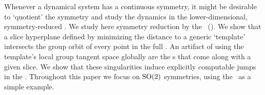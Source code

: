 
Whenever a dynamical system has a continuous symmetry, it might be
desirable to `quotient' the symmetry and study the dynamics in the
lower-dimensional, symmetry-reduced \statesp. We
study here symmetry reduction by the \mslices\ (\mframes). We show
that a slice hyperplane defined by minimizing the distance to a
generic `template' intersects the group orbit of every point in the full
{\statesp}. An artifact of using the template's local group tangent space
globally are the \sset s that come along with a given slice.
We show that these singularities induce explicitly
computable jumps in the \reducedsp. Throughout this paper we focus on
$\textrm{SO}(2)$ symmetries, using the \cLe\ as a simple example.

%

